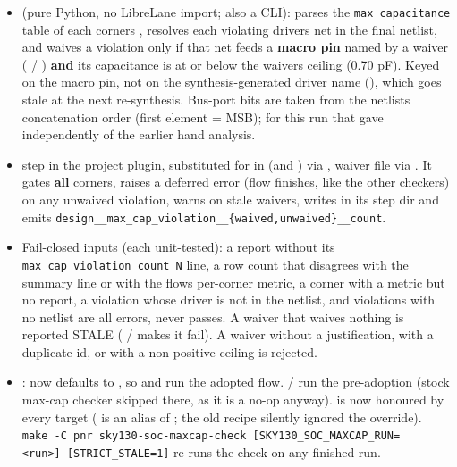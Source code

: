 \begin{record}

\begin{itemize}
\tightlist
\item
   (pure Python, no
  LibreLane import; also a CLI): parses the \texttt{max\ capacitance}
  table of each corner\textquotesingle s , resolves
  each violating driver\textquotesingle s net in the final netlist, and
  waives a violation only if that net feeds a \textbf{macro pin} named
  by a waiver ( / ) \textbf{and} its
  capacitance is at or below the waiver\textquotesingle s
   ceiling (0.70 pF). Keyed on the macro pin, not on
  the synthesis-generated driver name (), which goes
  stale at the next re-synthesis. Bus-port bits are taken from the
  netlist\textquotesingle s concatenation order (first element = MSB);
  for this run that gave  independently of the
  earlier hand analysis.
\item
   step in the project plugin, substituted
  for  in  (and
  ) via ,
  waiver file via . It gates \textbf{all}
  corners, raises a deferred error (flow finishes, like the other
  checkers) on any unwaived violation, warns on stale waivers, writes
   in its step dir and emits
  \texttt{design\_\allowbreak{}\_\allowbreak{}max\_\allowbreak{}cap\_\allowbreak{}violation\_\allowbreak{}\_\allowbreak{}\{waived,\allowbreak{}unwaived\}\_\allowbreak{}\_\allowbreak{}count}.
\item
  Fail-closed inputs (each unit-tested): a report without its
  \texttt{max\ cap\ violation\ count\ N} line, a row count that
  disagrees with the summary line or with the flow\textquotesingle s
  per-corner metric, a corner with a metric but no report, a violation
  whose driver is not in the netlist, and violations with no netlist are
  all errors, never passes. A waiver that waives nothing is reported
  STALE ( /  makes it
  fail). A waiver without a justification, with a duplicate id, or with
  a non-positive ceiling is rejected.
\item
  :  now defaults to
  , so  and
   run the adopted flow.  /
   run the pre-adoption 
  (stock max-cap checker skipped there, as it is a no-op anyway).
   is now honoured by every target
  ( is an alias of ; the old
  recipe silently ignored the override).
  \texttt{make\ -\allowbreak{}C\ pnr\ sky130-\allowbreak{}soc-\allowbreak{}maxcap-\allowbreak{}check\ [SKY130\_\allowbreak{}SOC\_\allowbreak{}MAXCAP\_\allowbreak{}RUN=\allowbreak{}<run>]\ [STRICT\_\allowbreak{}STALE=\allowbreak{}1]}
  re-runs the check on any finished run.
\end{itemize}


\end{record}
